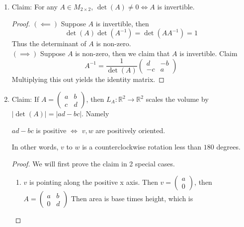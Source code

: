 \documentclass{article}
\newtheorem{one minute paper}[theorem]{One Minute Paper}
\begin{document}
\begin{enumerate}
    \item Claim: For any $A \in M_{2 \times 2}$, $\det(A) \neq 0 \iff A$ is invertible. 
    \begin{proof}
        $(\impliedby)$ Suppose $A$ is invertible, then 
        \begin{equation}
            \det(A)\det(A^{-1}) = \det(AA^{-1}) = 1
        \end{equation}
        Thus the determinant of $A$ is non-zero.  \\
        $(\implies)$ Suppose $A$ is non-zero, then we claim that $A$ is invertible. Claim 
        \begin{equation}
            A^{-1} = \frac{1}{\det(A)}\begin{pmatrix}
                d & -b \\
                -c & a
            \end{pmatrix}
        \end{equation}
        Multiplying this out yields the identity matrix. 
    \end{proof}  
    \item Claim: If $A = \begin{pmatrix}
        a & b \\
        c & d
    \end{pmatrix}$, then $L_A: \mathbb{R}^2 \rightarrow \mathbb{R}^2$ scales the volume by $|\det(A)| = |ad - bc|$. Namely 
    \begin{center}
        $ad - bc$ is positive $\iff$ $v,w$ are positively oriented. 
    \end{center}
    In other words, $v$ to $w$ is a counterclockwise rotation less than $180$ degrees. 
    \begin{proof}
        We will first prove the claim in 2 special cases.
        \begin{enumerate}
            \item $v$ is pointing along the positive x axis. 
            Then $v = \begin{pmatrix}
                a \\
                0
            \end{pmatrix}$, then $A = \begin{pmatrix}
                a & b \\
                0 & d
            \end{pmatrix}$ Then area is base times height, which is 
            \begin{equation}

\end{equation}
\end{enumerate}
\end{proof}
\end{enumerate}
\end{document}
